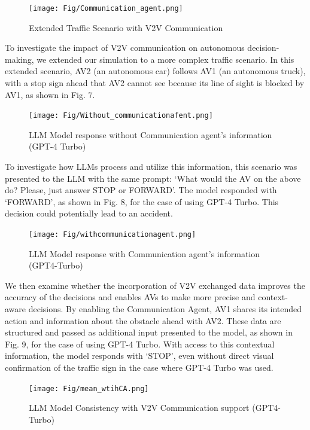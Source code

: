 \documentclass[conference]{IEEEtran}
\begin{document}
 \begin{figure}[h]
     \centering
     \texttt{[image: Fig/Communication\_agent.png]}
     \caption{Extended Traffic Scenario with V2V Communication }
     \label{fig:enter-label}
 \end{figure}
To investigate the impact of V2V communication on autonomous decision-making, we extended our simulation to a more complex traffic scenario. In this extended scenario, AV2 (an autonomous car) follows AV1 (an autonomous truck), with a stop sign ahead that AV2 cannot see because its line of sight is blocked by AV1, as shown in Fig. 7.
 \begin{figure}[!ht]
     \centering
     \texttt{[image: Fig/Without\_communicationafent.png]}
     \caption{LLM Model response without Communication agent's information (GPT-4 Turbo)}
     \label{fig:enter-label}
 \end{figure}
To investigate how LLMs process and utilize this information, this scenario was presented to the LLM with the same prompt: `What would the AV on the above do? Please, just answer STOP or FORWARD'. The model responded with `FORWARD', as shown in Fig. 8, for the case of using GPT-4 Turbo. This decision could potentially lead to an accident. 
\begin{figure}[h]
     \centering
     \texttt{[image: Fig/withcommunicationagent.png]}
     \caption{LLM Model response with Communication agent's information (GPT4-Turbo)}
     \label{fig:enter-label}
\end{figure} 
We then examine whether the incorporation of V2V exchanged data improves the accuracy of the decisions and enables AVs to make more precise and context-aware decisions. By enabling the Communication Agent, AV1 shares its intended action and information about the obstacle ahead with AV2. These data are structured and passed as additional input presented to the model, as shown in Fig. 9, for the case of using GPT-4 Turbo. With access to this contextual information, the model responds with `STOP', even without direct visual confirmation of the traffic sign in the case where GPT-4 Turbo was used. 
\begin{figure}[!ht]
     \centering
     \texttt{[image: Fig/mean\_wtihCA.png]}
     \caption{LLM Model Consistency with V2V Communication support (GPT4-Turbo) }
     \label{fig:enter-label}
\end{figure}
\end{document}
